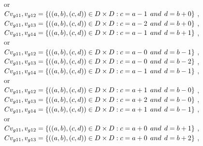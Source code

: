 \\or
\\$C{v_{g11},v_{g12}}=\{((a,b),(c,d))\in D\times D: c = a - 1\hspace{1ex} and \hspace{1ex}  d = b + 0 \}$ , 
\\$C{v_{g11},v_{g13}}=\{((a,b),(c,d))\in D\times D: c = a - 2\hspace{1ex} and \hspace{1ex}  d = b + 0 \}$ , 
\\$C{v_{g11},v_{g14}}=\{((a,b),(c,d))\in D\times D: c = a - 1\hspace{1ex} and \hspace{1ex}  d = b + 1 \}$ , 
\\or
\\$C{v_{g11},v_{g12}}=\{((a,b),(c,d))\in D\times D: c = a - 0\hspace{1ex} and \hspace{1ex}  d = b - 1 \}$ , 
\\$C{v_{g11},v_{g13}}=\{((a,b),(c,d))\in D\times D: c = a - 0\hspace{1ex} and \hspace{1ex}  d = b - 2 \}$ , 
\\$C{v_{g11},v_{g14}}=\{((a,b),(c,d))\in D\times D: c = a - 1\hspace{1ex} and \hspace{1ex}  d = b - 1 \}$ , 
\\or
\\$C{v_{g11},v_{g12}}=\{((a,b),(c,d))\in D\times D: c = a + 1\hspace{1ex} and \hspace{1ex}  d = b - 0 \}$ , 
\\$C{v_{g11},v_{g13}}=\{((a,b),(c,d))\in D\times D: c = a + 2\hspace{1ex} and \hspace{1ex}  d = b - 0 \}$ , 
\\$C{v_{g11},v_{g14}}=\{((a,b),(c,d))\in D\times D: c = a + 1\hspace{1ex} and \hspace{1ex}  d = b - 1 \}$ , 
\\or
\\$C{v_{g11},v_{g12}}=\{((a,b),(c,d))\in D\times D: c = a + 0\hspace{1ex} and \hspace{1ex}  d = b + 1 \}$ , 
\\$C{v_{g11},v_{g13}}=\{((a,b),(c,d))\in D\times D: c = a + 0\hspace{1ex} and \hspace{1ex}  d = b + 2 \}$ , 
